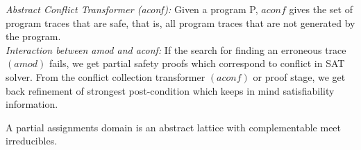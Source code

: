 \textit{Abstract Conflict Transformer (aconf):} Given a program P, $aconf$ gives the 
set of program traces that are safe, that is, all program traces that are not
generated by the program. \\

\textit{Interaction between amod and aconf:} If the search for finding an 
erroneous trace $(amod)$ fails, we get partial safety proofs which correspond 
to conflict in SAT solver. From the conflict collection transformer $(aconf)$ or 
proof stage, we get back refinement of strongest post-condition which keeps in 
mind satisfiability information.

A partial assignments domain is an abstract lattice with complementable 
meet irreducibles.  

